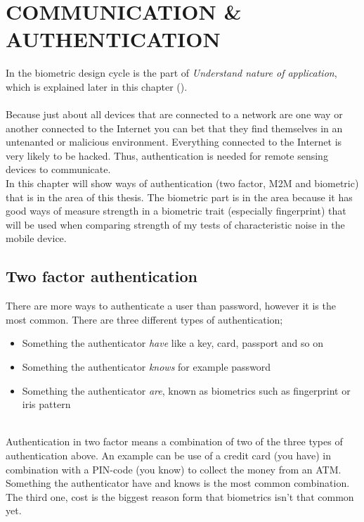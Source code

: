 \chapter{COMMUNICATION \& AUTHENTICATION}\label{cha:auth} 
In the biometric design cycle is the part of \textit{Understand nature of application}, which is explained later in this chapter ().\\
\\
Because just about all devices that are connected to a network are one way or another connected to the Internet you can bet that they find themselves in an untenanted or malicious environment. Everything connected to the Internet is very likely to be hacked. Thus, authentication is needed for remote sensing devices to communicate. \cite[]{auth:M2Mcom}\\
In this chapter will show ways of authentication (two factor, M2M and biometric) that is in the area of this thesis. The biometric part is in the area because it has good ways of measure strength in a biometric trait (especially fingerprint) that will be used when comparing strength of my tests of characteristic noise in the mobile device. \\


\section{Two factor authentication}\label{sec:2fauth} 
There are more ways to authenticate a user than password, however it is the most common. There are three different types of authentication; 
\begin{itemize}
	\item Something the authenticator \textit{have} like a key, card, passport and so on
	\item Something the authenticator \textit{knows} for example password
	\item Something the authenticator \textit{are}, known as biometrics such as fingerprint or iris pattern
\end{itemize}
\cite[p.~31]{rosssec} \\
Authentication in two factor means a combination of two of the three types of authentication above. An example can be use of a credit card (you have) in combination with a PIN-code (you know) to collect the money from an ATM. Something the authenticator have and knows is the most common combination. The third one, cost is the biggest reason form that biometrics isn't that common yet.
\cite[p.~47]{rosssec}

